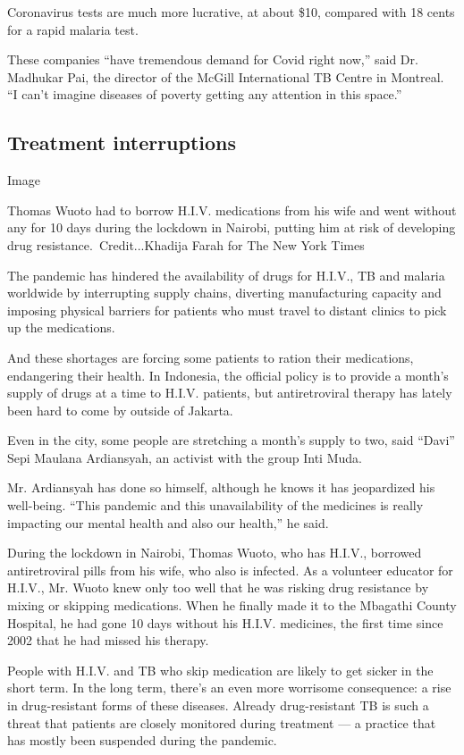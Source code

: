 Coronavirus tests are much more lucrative, at about \$10, compared with
18 cents for a rapid malaria test.

These companies ``have tremendous demand for Covid right now,'' said Dr.
Madhukar Pai, the director of the McGill International TB Centre in
Montreal. ``I can't imagine diseases of poverty getting any attention in
this space.''

\hypertarget{treatment-interruptions}{%
\subsection{Treatment interruptions}\label{treatment-interruptions}}

Image

Thomas Wuoto had to borrow H.I.V. medications from his wife and went
without any for 10 days during the lockdown in Nairobi, putting him at
risk of developing drug resistance.~Credit...Khadija Farah for The New
York Times

The pandemic has hindered the availability of drugs for H.I.V., TB and
malaria worldwide by interrupting supply chains, diverting manufacturing
capacity and imposing physical barriers for patients who must travel to
distant clinics to pick up the medications.

And these shortages are forcing some patients to ration their
medications, endangering their health. In Indonesia, the official policy
is to provide a month's supply of drugs at a time to H.I.V. patients,
but antiretroviral therapy has lately been hard to come by outside of
Jakarta.

Even in the city, some people are stretching a month's supply to two,
said ``Davi'' Sepi Maulana Ardiansyah, an activist with the group Inti
Muda.

Mr. Ardiansyah has done so himself, although he knows it has jeopardized
his well-being. ``This pandemic and this unavailability of the medicines
is really impacting our mental health and also our health,'' he said.

During the lockdown in Nairobi, Thomas Wuoto, who has H.I.V., borrowed
antiretroviral pills from his wife, who also is infected. As a volunteer
educator for H.I.V., Mr. Wuoto knew only too well that he was risking
drug resistance by mixing or skipping medications. When he finally made
it to the Mbagathi County Hospital, he had gone 10 days without his
H.I.V. medicines, the first time since 2002 that he had missed his
therapy.

People with H.I.V. and TB who skip medication are likely to get sicker
in the short term. In the long term, there's an even more worrisome
consequence: a rise in drug-resistant forms of these diseases. Already
drug-resistant TB is such a threat that patients are closely monitored
during treatment --- a practice that has mostly been suspended during
the pandemic.

